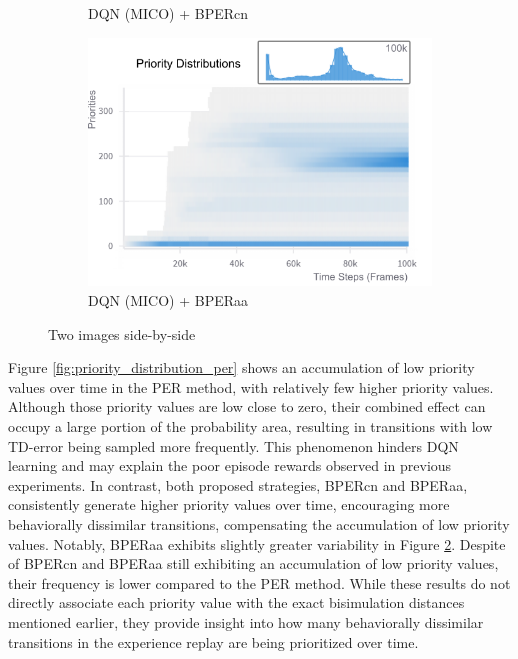 \begin{figure}[H]
\begin{subfigure}{0.32\textwidth}
        \caption{DQN (MICO) + BPERcn}
        \label{fig:priority_distribution_bpercn}
    \end{subfigure}
    \hfill
    \begin{subfigure}{0.32\textwidth}
        \includegraphics[width=\linewidth]{Results/grid_world/priority_distribution_dqn_mico_bperaa.png}
        \caption{DQN (MICO) + BPERaa}
        \label{fig:priority_distribution_bperaa}
    \end{subfigure}
    \caption{Two images side-by-side}
    \label{fig:priority_distributions}
\end{figure}

Figure \ref{fig:priority_distribution_per} shows an accumulation of low priority values over time in the PER method, with relatively few higher priority values. Although those priority values are low close to zero, their combined effect can occupy a large portion of the probability area, resulting in transitions with low TD-error being sampled more frequently. This phenomenon hinders DQN learning and may explain the poor episode rewards observed in previous experiments. In contrast, both proposed strategies, BPERcn and BPERaa, consistently generate higher priority values over time, encouraging more behaviorally dissimilar transitions, compensating the accumulation of low priority values. Notably, BPERaa exhibits slightly greater variability in Figure \ref{fig:priority_distribution_bperaa}. Despite of BPERcn and BPERaa still exhibiting an accumulation of low priority values, their frequency is lower compared to the PER method. While these results do not directly associate each priority value with the exact bisimulation distances mentioned earlier, they provide insight into how many behaviorally dissimilar transitions in the experience replay are being prioritized over time.

